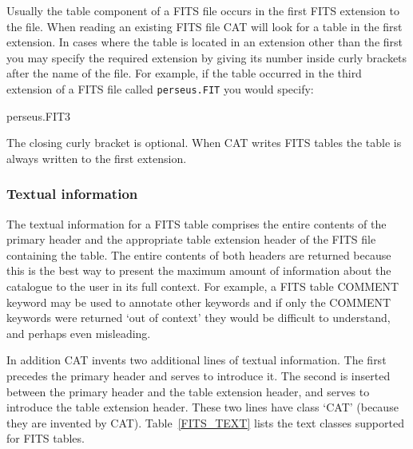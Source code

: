 \documentclass[11pt,twoside]{starlink}
\begin{document}
Usually the table component of a FITS file occurs in the first FITS
extension to the file. When reading an existing FITS file CAT will look
for a table in the first extension. In cases where the table is located
in an extension other than the first you may specify the required
extension by giving its number inside curly brackets after the name
of the file. For example, if the table occurred in the third extension
of a FITS file called \texttt{perseus.FIT} you would specify:

\begin{terminalv}
perseus.FIT{3}
\end{terminalv}

The closing curly bracket is optional. When CAT writes FITS tables
the table is always written to the first extension.

\subsubsection{Textual information}

The textual information for a FITS table comprises the entire contents
of the primary header and the appropriate table extension header of the
FITS file containing the table. The entire contents of both headers are
returned because this is the best way to present the maximum amount of
information about the catalogue to the user in its full context. For
example, a FITS table COMMENT keyword may be used to annotate other
keywords and if only the COMMENT keywords were returned `out of context'
they would be difficult to understand, and perhaps even misleading.

In addition CAT invents two additional lines of textual information.
The first precedes the primary header and serves to introduce it. The
second is inserted between the primary header and the table extension
header, and serves to introduce the table extension header. These two
lines have class `CAT' (because they are invented by CAT).
Table~\ref{FITS_TEXT} lists the text classes supported for FITS
tables.
\end{document}
